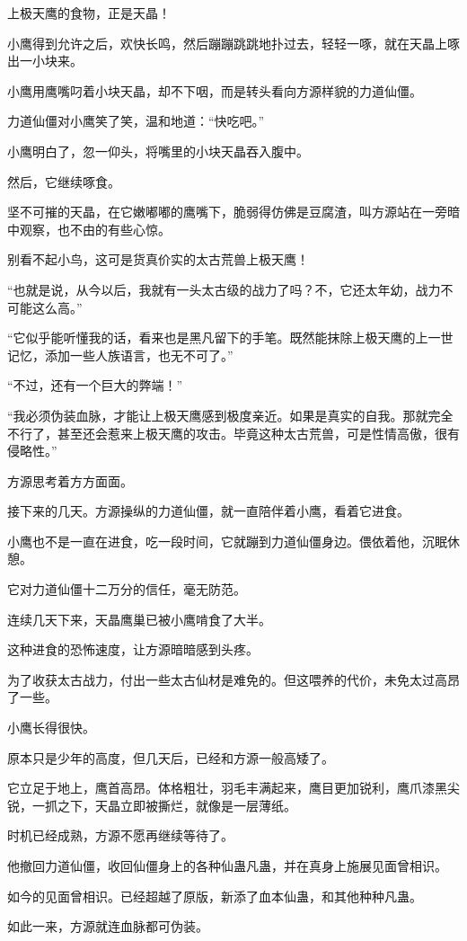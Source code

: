 \begin{this_body}
上极天鹰的食物，正是天晶！

小鹰得到允许之后，欢快长鸣，然后蹦蹦跳跳地扑过去，轻轻一啄，就在天晶上啄出一小块来。

小鹰用鹰嘴叼着小块天晶，却不下咽，而是转头看向方源样貌的力道仙僵。

力道仙僵对小鹰笑了笑，温和地道：“快吃吧。”

小鹰明白了，忽一仰头，将嘴里的小块天晶吞入腹中。

然后，它继续啄食。

坚不可摧的天晶，在它嫩嘟嘟的鹰嘴下，脆弱得仿佛是豆腐渣，叫方源站在一旁暗中观察，也不由的有些心惊。

别看不起小鸟，这可是货真价实的太古荒兽上极天鹰！

“也就是说，从今以后，我就有一头太古级的战力了吗？不，它还太年幼，战力不可能这么高。”

“它似乎能听懂我的话，看来也是黑凡留下的手笔。既然能抹除上极天鹰的上一世记忆，添加一些人族语言，也无不可了。”

“不过，还有一个巨大的弊端！”

“我必须伪装血脉，才能让上极天鹰感到极度亲近。如果是真实的自我。那就完全不行了，甚至还会惹来上极天鹰的攻击。毕竟这种太古荒兽，可是性情高傲，很有侵略性。”

方源思考着方方面面。

接下来的几天。方源操纵的力道仙僵，就一直陪伴着小鹰，看着它进食。

小鹰也不是一直在进食，吃一段时间，它就蹦到力道仙僵身边。偎依着他，沉眠休憩。

它对力道仙僵十二万分的信任，毫无防范。

连续几天下来，天晶鹰巢已被小鹰啃食了大半。

这种进食的恐怖速度，让方源暗暗感到头疼。

为了收获太古战力，付出一些太古仙材是难免的。但这喂养的代价，未免太过高昂了一些。

小鹰长得很快。

原本只是少年的高度，但几天后，已经和方源一般高矮了。

它立足于地上，鹰首高昂。体格粗壮，羽毛丰满起来，鹰目更加锐利，鹰爪漆黑尖锐，一抓之下，天晶立即被撕烂，就像是一层薄纸。

时机已经成熟，方源不愿再继续等待了。

他撤回力道仙僵，收回仙僵身上的各种仙蛊凡蛊，并在真身上施展见面曾相识。

如今的见面曾相识。已经超越了原版，新添了血本仙蛊，和其他种种凡蛊。

如此一来，方源就连血脉都可伪装。


\end{this_body}
